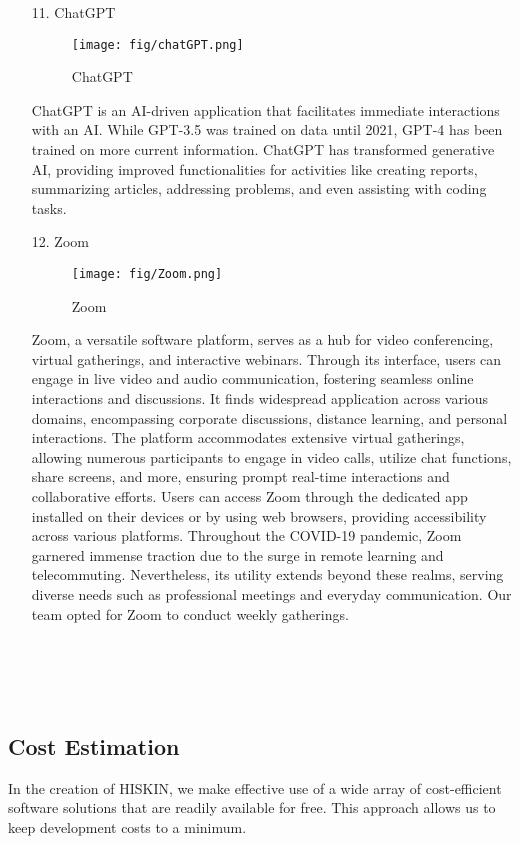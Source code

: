 \documentclass[conference]{IEEEtran}
\begin{document}
\begin{enumerate}
    \item[11.]ChatGPT
    \begin{figure}[h]
    \centering
    \texttt{[image: fig/chatGPT.png]}
    \label{fig:ChatGPT}
    \caption{ChatGPT} 
    \end{figure}
    \item[]ChatGPT is an AI-driven application that facilitates immediate interactions with an AI. While GPT-3.5 was trained on data until 2021, GPT-4 has been trained on more current information. ChatGPT has transformed generative AI, providing improved functionalities for activities like creating reports, summarizing articles, addressing problems, and even assisting with coding tasks.\\ 
   
    \item[12.]Zoom \cite{kohnke2022facilitating}
    \begin{figure}[h]
    \centering
    \texttt{[image: fig/Zoom.png]}
    \label{fig:Zoom}
    \caption{Zoom} 
    \end{figure}
    \item[]Zoom, a versatile software platform, serves as a hub for video conferencing, virtual gatherings, and interactive webinars. Through its interface, users can engage in live video and audio communication, fostering seamless online interactions and discussions. It finds widespread application across various domains, encompassing corporate discussions, distance learning, and personal interactions. The platform accommodates extensive virtual gatherings, allowing numerous participants to engage in video calls, utilize chat functions, share screens, and more, ensuring prompt real-time interactions and collaborative efforts. Users can access Zoom through the dedicated app installed on their devices or by using web browsers, providing accessibility across various platforms. Throughout the COVID-19 pandemic, Zoom garnered immense traction due to the surge in remote learning and telecommuting. Nevertheless, its utility extends beyond these realms, serving diverse needs such as professional meetings and everyday communication. Our team opted for Zoom to conduct weekly gatherings.\\ \\ \\ \\ \\
\end{enumerate}

\subsection{Cost Estimation}
In the creation of HISKIN, we make effective use of a wide array of cost-efficient software solutions that are readily available for free. This approach allows us to keep development costs to a minimum.\\ 
\end{document}
